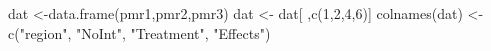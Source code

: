 \begin{Schunk}
\begin{Sinput}
 dat <-data.frame(pmr1,pmr2,pmr3)
 dat <- dat[ ,c(1,2,4,6)]
 colnames(dat) <- c("region", "NoInt", "Treatment", "Effects")
\end{Sinput}
\end{Schunk}
